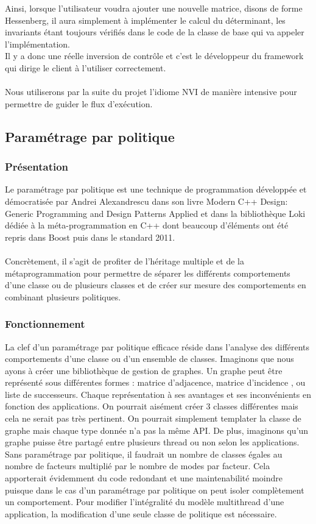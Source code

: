 Ainsi, lorsque l'utilisateur voudra ajouter une nouvelle matrice, disons de forme Hessenberg, il aura simplement à implémenter le calcul du déterminant, les invariants étant toujours vérifiés dans le code de la classe de base qui va appeler l'implémentation.\\
Il y a donc une réelle inversion de contrôle et c'est le développeur du framework qui dirige le client à l'utiliser correctement.\\\\

Nous utiliserons par la suite du projet l'idiome NVI de manière intensive pour permettre de guider le flux d'exécution.

\subsection{Paramétrage par politique}
\subsubsection{Présentation}
Le paramétrage par politique est une technique de programmation développée et démocratisée par Andrei Alexandrescu dans son livre Modern C++ Design: Generic Programming and Design Patterns Applied et dans la bibliothèque Loki dédiée à la méta-programmation en C++ dont beaucoup d'éléments ont été repris dans Boost puis dans le standard 2011.\\\\
Concrètement, il s'agit de profiter de l'héritage multiple et de la métaprogrammation pour permettre de séparer les différents comportements d'une classe ou de plusieurs classes et de créer sur mesure des comportements en combinant plusieurs politiques.

\subsubsection{Fonctionnement}
La clef d'un paramétrage par politique efficace réside dans l'analyse des différents comportements d'une classe ou d'un ensemble de classes. Imaginons que nous ayons à créer une bibliothèque de gestion de graphes. Un graphe peut être représenté sous différentes formes : matrice d'adjacence, matrice d'incidence , ou liste de successeurs. Chaque représentation à ses avantages et ses inconvénients en fonction des applications. On pourrait aisément créer 3 classes différentes mais cela ne serait pas très pertinent. On pourrait simplement templater la classe de graphe mais chaque type donnée n'a pas la même API. De plus, imaginons qu'un graphe puisse être partagé entre plusieurs thread ou non selon les applications.\\
Sans paramétrage par politique, il faudrait un nombre de classes égales au nombre de facteurs multiplié par le nombre de modes par facteur. Cela apporterait évidemment du code redondant et une maintenabilité moindre puisque dans le cas d'un paramétrage par politique on peut isoler complètement un comportement. Pour modifier l'intégralité du modèle multithread d'une application, la modification d'une seule classe de politique est nécessaire.\\\\

